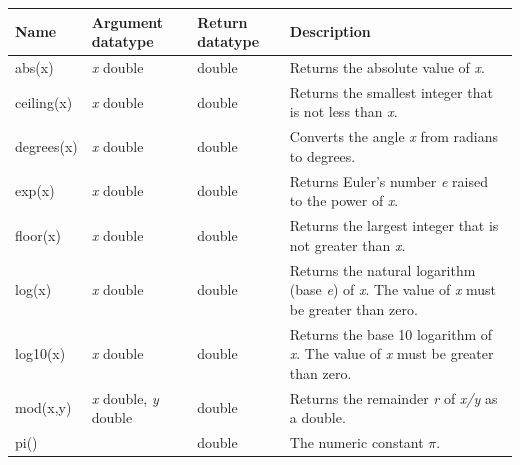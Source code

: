\documentclass[11pt,a4paper]{ivoa}
\begin{document}
\begin{table}[thm]\footnotesize
    \begin{tabular}{|p{}|p{}|p{}|p{}|}
        \hline

        \hline
        \textbf{Name} &
        \textbf{Argument \newline datatype} &
        \textbf{Return \newline datatype} &
        \textbf{Description}
        \tabularnewline

        \hline
        abs(x) &
        \textit{x} double &
        double &
        Returns the absolute value of \textit{x}.
        \tabularnewline

        \hline
        ceiling(x) &
        \textit{x} double &
        double &
        Returns the smallest integer that is not less than \textit{x}.
        \tabularnewline

        \hline
        degrees(x) &
        \textit{x} double &
        double &
        Converts the angle \textit{x} from radians to degrees.
        \tabularnewline

        \hline
        exp(x) &
        \textit{x} double &
        double &
        Returns Euler’s number \textit{e} raised to the power of \textit{x}.
        \tabularnewline

        \hline
        floor(x) &
        \textit{x} double &
        double &
        Returns the largest integer that is not greater than \textit{x}.
        \tabularnewline

        \hline
        log(x) &
        \textit{x} double &
        double &
        Returns the natural logarithm (base \textit{e}) of \textit{x}. The value of \textit{x} must be greater than zero.
        \tabularnewline

        \hline
        log10(x) &
        \textit{x} double &
        double &
        Returns the base 10 logarithm of \textit{x}. The value of \textit{x} must be greater than zero.
        \tabularnewline

        \hline
        mod(x,y) &
        \textit{x} double,
        \newline
        \textit{y} double &
        double &
        Returns the remainder \textit{r} of \textit{x/y} as a double.
        \tabularnewline
        
        \hline
        pi() &
        &
        double &
        The numeric constant \(\pi\).
        \tabularnewline
        

\end{tabular}
\end{table}
\end{document}
